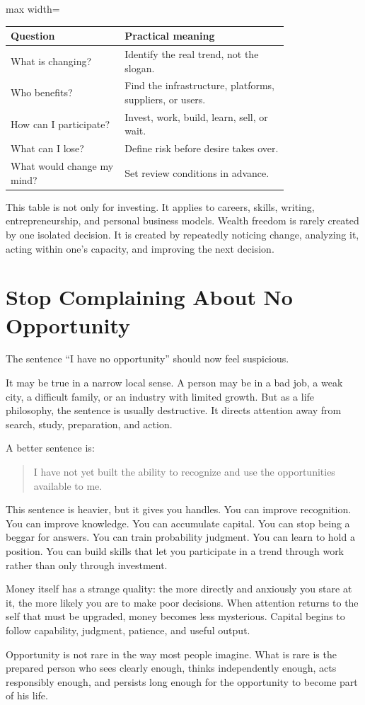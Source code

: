 \begin{center}
\begin{adjustbox}{max width=\linewidth}
\begin{tabular}{p{0.32\linewidth}p{0.46\linewidth}}
\hline
Question & Practical meaning \\
\hline
What is changing? & Identify the real trend, not the slogan. \\
Who benefits? & Find the infrastructure, platforms, suppliers, or users. \\
How can I participate? & Invest, work, build, learn, sell, or wait. \\
What can I lose? & Define risk before desire takes over. \\
What would change my mind? & Set review conditions in advance. \\
\hline
\end{tabular}
\end{adjustbox}
\end{center}

This table is not only for investing. It applies to careers, skills, writing, entrepreneurship, and personal business models. Wealth freedom is rarely created by one isolated decision. It is created by repeatedly noticing change, analyzing it, acting within one's capacity, and improving the next decision.

\section*{Stop Complaining About No Opportunity}

The sentence ``I have no opportunity'' should now feel suspicious.

It may be true in a narrow local sense. A person may be in a bad job, a weak city, a difficult family, or an industry with limited growth. But as a life philosophy, the sentence is usually destructive. It directs attention away from search, study, preparation, and action.

A better sentence is:

\begin{quote}
I have not yet built the ability to recognize and use the opportunities available to me.
\end{quote}

This sentence is heavier, but it gives you handles. You can improve recognition. You can improve knowledge. You can accumulate capital. You can stop being a beggar for answers. You can train probability judgment. You can learn to hold a position. You can build skills that let you participate in a trend through work rather than only through investment.

Money itself has a strange quality: the more directly and anxiously you stare at it, the more likely you are to make poor decisions. When attention returns to the self that must be upgraded, money becomes less mysterious. Capital begins to follow capability, judgment, patience, and useful output.

Opportunity is not rare in the way most people imagine. What is rare is the prepared person who sees clearly enough, thinks independently enough, acts responsibly enough, and persists long enough for the opportunity to become part of his life.
